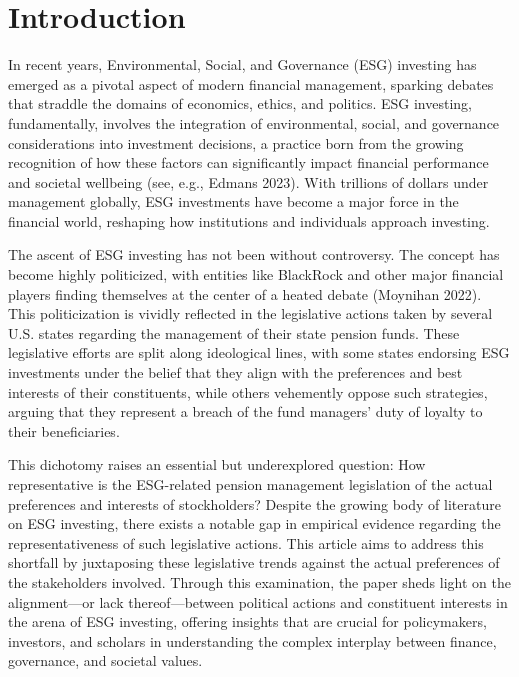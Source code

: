 \documentclass[
  12pt,
]{article}
\begin{document}
\hypertarget{introduction}{%
\section{Introduction}\label{introduction}}

In recent years, Environmental, Social, and Governance (ESG) investing has emerged as a pivotal aspect of modern financial management, sparking debates that straddle the domains of economics, ethics, and politics. ESG investing, fundamentally, involves the integration of environmental, social, and governance considerations into investment decisions, a practice born from the growing recognition of how these factors can significantly impact financial performance and societal wellbeing (see, e.g., Edmans 2023). With trillions of dollars under management globally, ESG investments have become a major force in the financial world, reshaping how institutions and individuals approach investing.

The ascent of ESG investing has not been without controversy. The concept has become highly politicized, with entities like BlackRock and other major financial players finding themselves at the center of a heated debate (Moynihan 2022). This politicization is vividly reflected in the legislative actions taken by several U.S. states regarding the management of their state pension funds. These legislative efforts are split along ideological lines, with some states endorsing ESG investments under the belief that they align with the preferences and best interests of their constituents, while others vehemently oppose such strategies, arguing that they represent a breach of the fund managers' duty of loyalty to their beneficiaries.

This dichotomy raises an essential but underexplored question: How representative is the ESG-related pension management legislation of the actual preferences and interests of stockholders? Despite the growing body of literature on ESG investing, there exists a notable gap in empirical evidence regarding the representativeness of such legislative actions. This article aims to address this shortfall by juxtaposing these legislative trends against the actual preferences of the stakeholders involved. Through this examination, the paper sheds light on the alignment---or lack thereof---between political actions and constituent interests in the arena of ESG investing, offering insights that are crucial for policymakers, investors, and scholars in understanding the complex interplay between finance, governance, and societal values.
\end{document}

